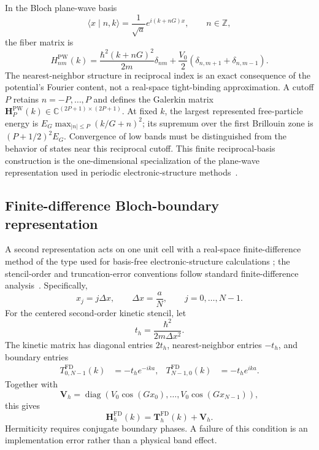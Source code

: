 In the Bloch plane-wave basis
\begin{equation}
    \langle x\mid n,k\rangle
    =
    \frac{1}{\sqrt a}e^{i(k+nG)x},
    \qquad n\in\mathbb Z,
\end{equation}
the fiber matrix is
\begin{equation}
    H^{\mathrm{PW}}_{nm}(k)
    =
    \frac{\hbar^2(k+nG)^2}{2m}\delta_{nm}
    +\frac{V_0}{2}
    \left(\delta_{n,m+1}+\delta_{n,m-1}\right).
    \label{eq:periodic-1d-pw-matrix}
\end{equation}
The nearest-neighbor structure in reciprocal index is an exact consequence of
the potential's Fourier content, not a real-space tight-binding approximation.
A cutoff $P$ retains $n=-P,\ldots,P$ and defines the Galerkin matrix
$\mathbf H_P^{\mathrm{PW}}(k)\in\mathbb C^{(2P+1)\times(2P+1)}$.
At fixed $k$, the largest represented free-particle energy is
$E_G\max_{|n|\leq P}(k/G+n)^2$; its supremum over the first Brillouin zone is
$(P+1/2)^2E_G$. Convergence of low bands must be distinguished from the behavior
of states near this reciprocal cutoff. This finite reciprocal-basis construction is
the one-dimensional specialization of the plane-wave representation used in
periodic electronic-structure methods~\cite{payne1992}.

\subsection{Finite-difference Bloch-boundary representation}

A second representation acts on one unit cell with a real-space finite-difference
method of the type used for basis-free electronic-structure calculations
\cite{chelikowsky1994}; the stencil-order and truncation-error conventions follow
standard finite-difference analysis~\cite{strikwerda2004}. Specifically,
\begin{equation}
    x_j=j\Delta x,
    \qquad
    \Delta x=\frac{a}{N},
    \qquad
    j=0,\ldots,N-1.
\end{equation}
For the centered second-order kinetic stencil, let
\begin{equation}
    t_h=\frac{\hbar^2}{2m\Delta x^2}.
\end{equation}
The kinetic matrix has diagonal entries $2t_h$, nearest-neighbor entries
$-t_h$, and boundary entries
\begin{align}
    T^{\mathrm{FD}}_{0,N-1}(k)&=-t_h e^{-ika},
    &
    T^{\mathrm{FD}}_{N-1,0}(k)&=-t_h e^{ika}.
\end{align}
Together with
\begin{equation}
    \mathbf V_h
    =
    \operatorname{diag}\left(V_0\cos(Gx_0),\ldots,V_0\cos(Gx_{N-1})\right),
\end{equation}
this gives
\begin{equation}
    \mathbf H_h^{\mathrm{FD}}(k)
    =\mathbf T_h^{\mathrm{FD}}(k)+\mathbf V_h.
    \label{eq:periodic-1d-fd-matrix}
\end{equation}
Hermiticity requires conjugate boundary phases. A failure of this condition is
an implementation error rather than a physical band effect.

